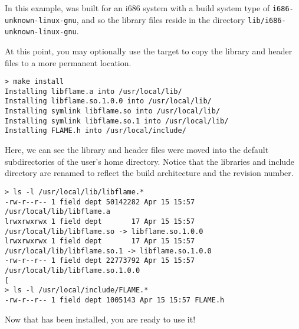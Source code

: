 \noindent
In this example, \libflame was built for an i686 system with a
build system type of {\tt i686-unknown-linux-gnu}, and so the
library files reside in the directory
{\tt lib/i686-unknown-linux-gnu}.

At this point, you may optionally use the \install target to copy the
library and header files to a more permanent location.

\begin{Verbatim}[frame=single,framesep=2.5mm,xleftmargin=5mm,commandchars=\\\{\},fontsize=\footnotesize]
> make install
Installing libflame.a into /usr/local/lib/
Installing libflame.so.1.0.0 into /usr/local/lib/
Installing symlink libflame.so into /usr/local/lib/
Installing symlink libflame.so.1 into /usr/local/lib/
Installing FLAME.h into /usr/local/include/
\end{Verbatim}

\noindent
Here, we can see the library and header files were moved into the default
subdirectories of the user's home directory.
Notice that the libraries and include directory are renamed to reflect
the build architecture and the revision number.

\begin{Verbatim}[frame=single,framesep=2.5mm,xleftmargin=5mm,commandchars=\\\{\},fontsize=\footnotesize]
> ls -l /usr/local/lib/libflame.*
-rw-r--r-- 1 field dept 50142282 Apr 15 15:57 /usr/local/lib/libflame.a
lrwxrwxrwx 1 field dept       17 Apr 15 15:57 /usr/local/lib/libflame.so -> libflame.so.1.0.0
lrwxrwxrwx 1 field dept       17 Apr 15 15:57 /usr/local/lib/libflame.so.1 -> libflame.so.1.0.0
-rw-r--r-- 1 field dept 22773792 Apr 15 15:57 /usr/local/lib/libflame.so.1.0.0
[
> ls -l /usr/local/include/FLAME.*
-rw-r--r-- 1 field dept 1005143 Apr 15 15:57 FLAME.h
\end{Verbatim}

Now that \libflame has been installed, you are ready to use it!



